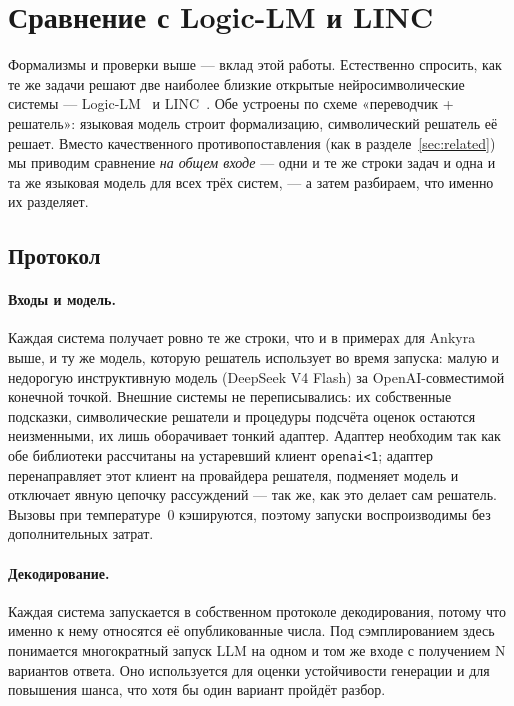 \documentclass[11pt,a4paper]{article}
\begin{document}
\section{Сравнение с Logic-LM и LINC}
\label{sec:comparison}

Формализмы и проверки выше — вклад этой работы. Естественно спросить, как те же задачи решают две наиболее близкие
открытые нейросимволические системы — Logic-LM~\cite{logiclm} и LINC~\cite{linc}. Обе устроены по схеме «переводчик
 + решатель»: языковая модель строит формализацию, символический решатель её решает. Вместо качественного противопоставления
(как в разделе~\ref{sec:related}) мы приводим сравнение \emph{на общем входе} — одни и те же строки задач и одна и та же
языковая модель для всех трёх систем, — а затем разбираем, что именно их разделяет.

\subsection{Протокол}
\label{sec:comparison-protocol}

\paragraph{Входы и модель.} Каждая система получает ровно те же строки, что и в примерах для Ankyra выше, и ту же модель, которую
решатель использует во время запуска: малую и недорогую инструктивную модель (DeepSeek V4 Flash) за OpenAI-совместимой
конечной точкой. Внешние системы не переписывались: их собственные подсказки, символические решатели и процедуры подсчёта
оценок остаются неизменными, их лишь оборачивает тонкий адаптер. Адаптер необходим так как обе библиотеки рассчитаны на устаревший клиент \texttt{openai<1};
адаптер перенаправляет этот клиент на провайдера решателя, подменяет модель и отключает явную цепочку рассуждений — так же,
как это делает сам решатель. Вызовы при температуре~$0$ кэшируются, поэтому запуски воспроизводимы без дополнительных затрат.

\paragraph{Декодирование.} Каждая система запускается в собственном протоколе декодирования, потому что именно к нему относятся её опубликованные числа.
Под сэмплированием здесь понимается многократный запуск LLM на одном и том же входе с получением N вариантов ответа. Оно используется для оценки
устойчивости генерации и для повышения шанса, что хотя бы один вариант пройдёт разбор.
\end{document}

